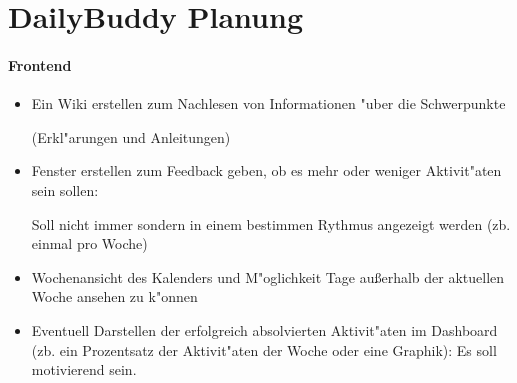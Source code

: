 \documentclass{article}
\begin{document}
\section*{DailyBuddy Planung}




\paragraph{Frontend}
\begin{itemize}
\item Ein Wiki erstellen zum Nachlesen von Informationen "uber die Schwerpunkte 

(Erkl"arungen und Anleitungen)
\item Fenster erstellen zum Feedback geben, ob es mehr oder weniger Aktivit"aten 
sein sollen:

Soll nicht immer sondern in einem bestimmen Rythmus angezeigt werden (zb. einmal pro Woche)
\item Wochenansicht des Kalenders und M"oglichkeit Tage au\ss erhalb der aktuellen Woche ansehen zu k"onnen
\item Eventuell Darstellen der erfolgreich absolvierten Aktivit"aten im Dashboard (zb. ein Prozentsatz der Aktivit"aten der Woche oder eine Graphik): Es soll motivierend sein.
\end{itemize}
\end{document}
